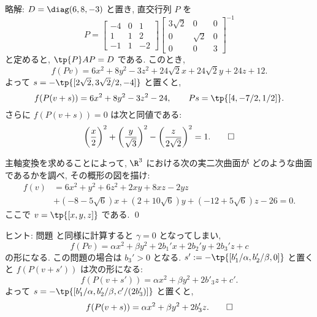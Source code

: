\documentclass[12pt,twoside]{jarticle}
\newcommand\commentout[1]{#1}
\newcommand\commentout[1]{}
\begin{document}
\commentout{
\medskip
\noindent
略解: $D=\diag(6,8,-3)$ と置き, 直交行列 $P$ を
\begin{equation*}
  P =
  \left[ 
    \begin{array}{rrr}
      -4 & 0 &  1 \\
       1 & 1 &  2 \\
      -1 & 1 & -2 
    \end{array}
  \right]
  \left[ 
    \begin{array}{ccr}
      3\sqrt{2} & 0        & 0 \\
      0         & \sqrt{2} & 0 \\
      0         & 0        & 3
    \end{array}
  \right]^{-1}
\end{equation*}
と定めると, $\tp{P}AP=D$ である. このとき,
\begin{equation*}
  f(Pv) =  6x^2 + 8y^2 - 3z^2 + 24\sqrt{2}x + 24\sqrt{2}y + 24z + 12.
\end{equation*}
よって $s = - \tp{[2\sqrt{2}, 3\sqrt{2}/2, -4]}$ と置くと, 
\begin{equation*}
  f(P(v+s)) = 6x^2 + 8y^2 - 3z^2 - 24,
  \qquad
  Ps = \tp{[4, -7/2, 1/2]}.
\end{equation*}
さらに $f(P(v+s))=0$ は次と同値である:
\begin{equation*}
    \biggl(\frac{x}{2}\biggr)^2
  + \biggl(\frac{y}{\sqrt{3}}\biggr)^2
  - \biggl(\frac{z}{2\sqrt{2}}\biggr)^2
  = 1.
  \qed
\end{equation*}
}


\begin{question}
\label{q:arq-2}
  主軸変換を求めることによって, $\R^3$ における次の実二次曲面が
  どのような曲面であるかを調べ, その概形の図を描け:
  \begin{align*}
    f(v)
    &
    = 6x^2 + y^2 + 6z^2
    + 2xy + 8xz - 2yz 
    \\ &
    + (- 8 - 5\sqrt{6})x
    + (2 + 10\sqrt{6})y
    + (- 12 + 5\sqrt{6})z 
    - 26
    = 0.
  \end{align*}
  ここで $v=\tp{[x,y,z]}$ である. \qed
\end{question}

\noindent
ヒント: 問題  と同様に計算すると $\gamma=0$ となってしまい,
\begin{equation*}
  f(Pv) 
  = \alpha x^2 + \beta y^2 
  + 2b_1'x + 2b_2'y + 2b_3'z
  + c
\end{equation*}
の形になる.  この問題の場合は $b_3'>0$ となる.
$s':=-\tp{[b_1'/\alpha,b_2'/\beta,0]}$ と置くと $f(P(v+s'))$ は次の形になる:
\begin{equation*}
  f(P(v+s')) = \alpha x^2 + \beta y^2 + 2b'_3z + c'.
\end{equation*}
よって $s=-\tp{[b_1'/\alpha,b_2'/\beta,c'/(2b'_3)]}$ と置くと,
\begin{equation*}
  f(P(v+s)) = \alpha x^2 + \beta y^2 + 2b'_3z.
  \qed
\end{equation*}
\end{document}
